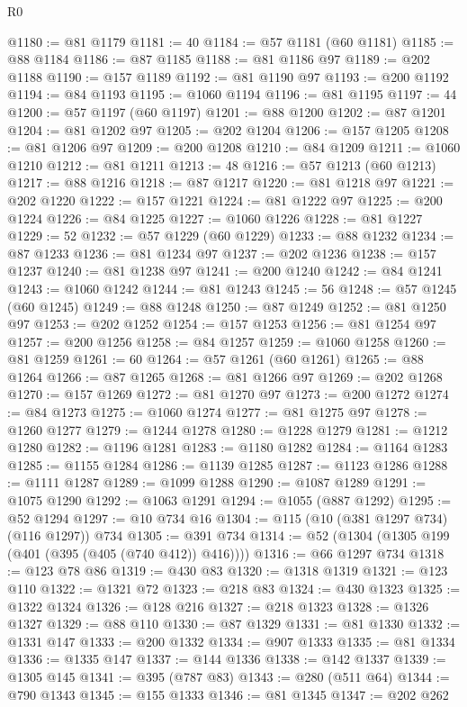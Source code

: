 \begin{lexlean}{R0}
\begin{coremodule}
@1180 := @81 @1179
@1181 := 40
@1184 := @57 @1181 (@60 @1181)
@1185 := @88 @1184
@1186 := @87 @1185
@1188 := @81 @1186 @97
@1189 := @202 @1188
@1190 := @157 @1189
@1192 := @81 @1190 @97
@1193 := @200 @1192
@1194 := @84 @1193
@1195 := @1060 @1194
@1196 := @81 @1195
@1197 := 44
@1200 := @57 @1197 (@60 @1197)
@1201 := @88 @1200
@1202 := @87 @1201
@1204 := @81 @1202 @97
@1205 := @202 @1204
@1206 := @157 @1205
@1208 := @81 @1206 @97
@1209 := @200 @1208
@1210 := @84 @1209
@1211 := @1060 @1210
@1212 := @81 @1211
@1213 := 48
@1216 := @57 @1213 (@60 @1213)
@1217 := @88 @1216
@1218 := @87 @1217
@1220 := @81 @1218 @97
@1221 := @202 @1220
@1222 := @157 @1221
@1224 := @81 @1222 @97
@1225 := @200 @1224
@1226 := @84 @1225
@1227 := @1060 @1226
@1228 := @81 @1227
@1229 := 52
@1232 := @57 @1229 (@60 @1229)
@1233 := @88 @1232
@1234 := @87 @1233
@1236 := @81 @1234 @97
@1237 := @202 @1236
@1238 := @157 @1237
@1240 := @81 @1238 @97
@1241 := @200 @1240
@1242 := @84 @1241
@1243 := @1060 @1242
@1244 := @81 @1243
@1245 := 56
@1248 := @57 @1245 (@60 @1245)
@1249 := @88 @1248
@1250 := @87 @1249
@1252 := @81 @1250 @97
@1253 := @202 @1252
@1254 := @157 @1253
@1256 := @81 @1254 @97
@1257 := @200 @1256
@1258 := @84 @1257
@1259 := @1060 @1258
@1260 := @81 @1259
@1261 := 60
@1264 := @57 @1261 (@60 @1261)
@1265 := @88 @1264
@1266 := @87 @1265
@1268 := @81 @1266 @97
@1269 := @202 @1268
@1270 := @157 @1269
@1272 := @81 @1270 @97
@1273 := @200 @1272
@1274 := @84 @1273
@1275 := @1060 @1274
@1277 := @81 @1275 @97
@1278 := @1260 @1277
@1279 := @1244 @1278
@1280 := @1228 @1279
@1281 := @1212 @1280
@1282 := @1196 @1281
@1283 := @1180 @1282
@1284 := @1164 @1283
@1285 := @1155 @1284
@1286 := @1139 @1285
@1287 := @1123 @1286
@1288 := @1111 @1287
@1289 := @1099 @1288
@1290 := @1087 @1289
@1291 := @1075 @1290
@1292 := @1063 @1291
@1294 := @1055 (@887 @1292)
@1295 := @52 @1294
@1297 := @10 @734 @16
@1304 := @115 (@10 (@381 @1297 @734) (@116 @1297)) @734
@1305 := @391 @734
@1314 := @52 (@1304 (@1305 @199 (@401 (@395 (@405 (@740 @412)) @416))))
@1316 := @66 @1297 @734
@1318 := @123 @78 @86
@1319 := @430 @83
@1320 := @1318 @1319
@1321 := @123 @110
@1322 := @1321 @72
@1323 := @218 @83
@1324 := @430 @1323
@1325 := @1322 @1324
@1326 := @128 @216
@1327 := @218 @1323
@1328 := @1326 @1327
@1329 := @88 @110
@1330 := @87 @1329
@1331 := @81 @1330
@1332 := @1331 @147
@1333 := @200 @1332
@1334 := @907 @1333
@1335 := @81 @1334
@1336 := @1335 @147
@1337 := @144 @1336
@1338 := @142 @1337
@1339 := @1305 @145
@1341 := @395 (@787 @83)
@1343 := @280 (@511 @64)
@1344 := @790 @1343
@1345 := @155 @1333
@1346 := @81 @1345
@1347 := @202 @262

\end{coremodule}
\end{lexlean}

